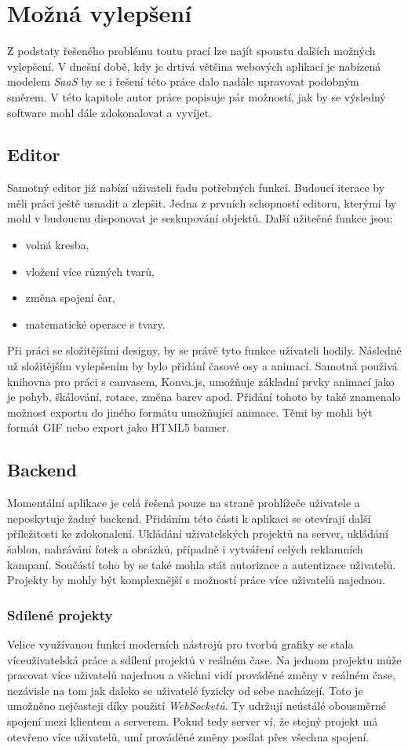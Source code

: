 \chapter{Možná vylepšení}
\label{chap:future}
Z podstaty řešeného problému toutu prací lze najít spoustu dalších možných vylepšení. V dnešní době, kdy je drtivá většina webových
aplikací je nabízená modelem \emph{SaaS} by se i řešení této práce dalo nadále upravovat podobným směrem.
V této kapitole autor práce popisuje pár možností, jak by se výsledný software mohl dále zdokonalovat a vyvíjet.

\section{Editor}
Samotný editor již nabízí uživateli řadu potřebných funkcí. Budoucí iterace by měli práci ještě usnadit a zlepšit. Jedna z prvních schopností
editoru, kterými by mohl v budoucnu disponovat je seskupování objektů. Další užitečné funkce jsou:
\begin{itemize}
    \item volná kresba,
    \item vložení více různých tvarů,
    \item změna spojení čar,
    \item matematické operace s tvary.
\end{itemize}
Při práci se složitějšími designy, by se právě tyto funkce uživateli hodily.
Následně už složitějším vylepšením by bylo přidání časové osy a animací. Samotná použivá knihovna pro práci s canvasem, Konva.js, umožňuje základní
prvky animací jako je pohyb, škálování, rotace, změna barev apod. Přidání tohoto by také znamenalo možnost exportu do jiného formátu umožňující animace.
Těmi by mohli být formát GIF nebo export jako HTML5 banner.

\section{Backend}
Momentální aplikace je celá řešená pouze na straně prohlížeče uživatele a neposkytuje žadný backend. Přidáním této části k aplikaci se otevírají
další příležitosti ke zdokonalení. Ukládání uživatelských projektů na server, ukládání šablon, nahrávání fotek a obrázků, případně i vytváření celých reklamních 
kampaní. Součástí toho by se také mohla stát autorizace a autentizace uživatelů. Projekty by mohly být komplexnější s možností práce více uživatelů najednou.

\subsection{Sdílené projekty}
Velice využívanou funkcí moderních nástrojů pro tvorbů grafiky se stala víceuživatelská práce a sdílení projektů v reálném čase. Na jednom projektu
může pracovat více uživatelů najednou a všichni vidí prováděné změny v reálném čase, nezávisle na tom jak daleko se uživatelé fyzicky od sebe 
nacházejí. Toto je umožněno nejčasteji díky použití \emph{WebSocketů}. Ty udržují neústálé obousměrné spojení mezi klientem a serverem. Pokud tedy server
ví, že stejný projekt má otevřeno více uživatelů, umí prováděné změny posílat přes všechna spojení.

